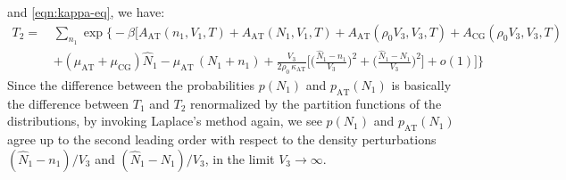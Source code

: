 \documentclass[aip,jcp,a4paper,reprint,onecolumn]{revtex4-1}
\newcommand{\AT}{{\textrm{{AT}}}}
\newcommand{\CG}{{\textrm{CG}}}
\begin{document}
and \eqref{eqn:kappa-eq}, we have:
\begin{align}\nonumber
  T_2
  = \,&
  \sum_{n_1}
  \exp
  \Big\{-\beta
  \Big[
  A_{\AT}(n_1,V_1,T) +
  A_{\AT}(N_1,V_1,T) +
  A_{\AT}(\rho_0V_3,V_3,T) +
  A_{\CG}(\rho_0V_3,V_3,T) \\
  \,&+(\mu_\AT + \mu_\CG)\hat N_1
  -\mu_{\AT}\,(N_1 + n_1) +
  \frac{V_3}{2\rho_0\, \kappa_{\AT}}
  \Big[
  \Big(
  \frac{\hat N_1 - n_1}{V_3}
  \Big)^2
  +
  \Big(
  \frac{\hat N_1 - N_1}{V_3}
  \Big)^2
  \Big]
  + o(1)
  \Big]
  \Big\}
\end{align}
Since the difference between the probabilities
$p(N_1)$ and $p_{\AT}(N_1)$ is basically the difference between $T_1$
and $T_2$ renormalized by the partition functions of the distributions,
by
invoking Laplace's method again,
we see $p(N_1)$ and $p_{\AT}(N_1)$ agree up to
the second leading
order with respect to the density perturbations
$(\hat N_1 - n_1)/{V_3}$
and $(\hat N_1 - N_1)/{V_3}$,
in the limit $V_{3}\to\infty$.


\end{document}
